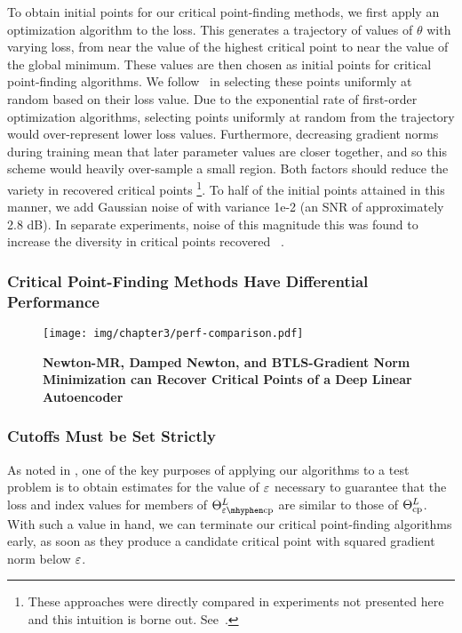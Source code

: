 \documentclass[../../thesis.tex]{subfiles}
\begin{document}
To obtain initial points for our critical point-finding methods,
we first apply an optimization algorithm to the loss.
This generates a trajectory of values of $\theta$ with varying loss,
from near the value of the highest critical point
to near the value of the global minimum.
These values are then chosen as initial points
for critical point-finding algorithms.
We follow~\cite{pennington2017} in selecting these points
uniformly at random based on their loss value.
Due to the exponential rate of first-order optimization algorithms,
selecting points uniformly at random from the trajectory
would over-represent lower loss values.
Furthermore, decreasing gradient norms during training mean that
later parameter values are closer together,
and so this scheme would heavily over-sample a small region.
Both factors should reduce the variety in recovered critical points%
\footnote{These approaches were directly compared in
experiments not presented here and this intuition is borne out.
See~\cite{frye2019}.}.
To half of the initial points attained in this manner,
we add Gaussian noise of with variance 1e-2
(an SNR of approximately 2.8 dB).
In separate experiments,
noise of this magnitude
this was found to increase
the diversity in critical points recovered%
~\cite{frye2019}.

\subsubsection{Critical Point-Finding Methods Have Differential Performance}%

\begin{figure}[h]
	\begin{center}
		\texttt{[image: img/chapter3/perf-comparison.pdf]}
	\end{center}
	\caption{\textbf{Newton-MR, Damped Newton, and BTLS-Gradient Norm Minimization
	can Recover Critical Points of a Deep Linear Autoencoder}}
\end{figure}

\subsubsection{Cutoffs Must be Set Strictly}%

As noted in ,
one of the key purposes of applying our algorithms
to a test problem is to obtain estimates for the value
of $\varepsilon$ necessary to guarantee that the loss and index values
for members of $\Theta^L_{\ecp}$
are similar to those of $\Theta^L_{\mathrm{cp}}$.
With such a value in hand,
we can terminate our critical point-finding algorithms early,
as soon as they produce a candidate critical point with
squared gradient norm below $\varepsilon$.
\end{document}
